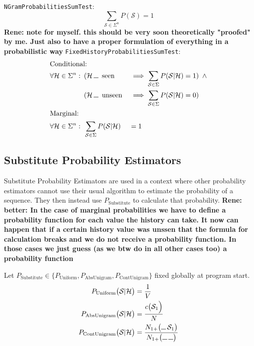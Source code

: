 \documentclass[11pt,a4paper]{article}
\newcommand{\Seq}{\mathcal{S}}
\newcommand{\Hist}{\mathcal{H}}
\newcommand{\Skp}{\rule{7pt}{.5pt}}
\newcommand{\rp}[1]{\textbf{Rene: #1}}
\begin{document}
  \texttt{NGramProbabilitiesSumTest}:
  \begin{equation}
    \sum_{\Seq \in \Sigma^n} P(\Seq) = 1
  \end{equation}
\rp{note for myself. this should be very soon theoretically "proofed" by me. Just also to have a proper formulation of everything in a probabilistic way}
  \texttt{FixedHistoryProbabilitiesSumTest}:
  \begin{alignat}{2}
    \intertext{Conditional:}
    \forall \Hist \in \Sigma^n:
    \enspace&(\Hist \, \Skp \enspace \mathrm{seen} &&\implies \sum_{\Seq \in \Sigma} P(\Seq | \Hist) = 1) \enspace \land \\
    \enspace&(\Hist \, \Skp \enspace \mathrm{unseen} &&\implies \sum_{\Seq \in \Sigma} P(\Seq | \Hist) = 0) \notag \\
    \intertext{Marginal:}
    \forall \Hist \in \Sigma^n:
    \enspace&\sum_{\Seq \in \Sigma} P(\Seq | \Hist) &&= 1
  \end{alignat}

  \subsection{Substitute Probability Estimators}

  Substitute Probability Estimators are used in a context where other
  probability estimators cannot use their usual algorithm to estimate the
  probability of a sequence. They then instead use $P_\mathrm{Substitute}$ to
  calculate that probability.
\rp{better: In the case of marginal probabilities we have to define a probability function for each value the history can take. It now can happen that if a certain history value was unssen that the formula for calculation breaks and we do not receive a probability function. In those cases we just guess (as we btw do in all other cases too) a probability function}

  Let $P_\mathrm{Substitute} \in \big\{ P_\mathrm{Uniform} , P_\mathrm{AbsUnigram} , P_\mathrm{ContUnigram}\big\}$
  fixed globally at program start.
  \begin{align}
    P_\mathrm{Uniform}\big(\Seq | \Hist\big) &= \frac{1}{V} \\
    P_\mathrm{AbsUnigram}\big(\Seq | \Hist\big) &= \frac{c\big(\Seq_1\Big)}{N} \\
    P_\mathrm{ContUnigram}\big(\Seq | \Hist\big) &= \frac{N_{1+}\big(\Skp \, \Seq_1\big)}{N_{1+}\big(\Skp \, \Skp\big)}
  \end{align}
\end{document}
